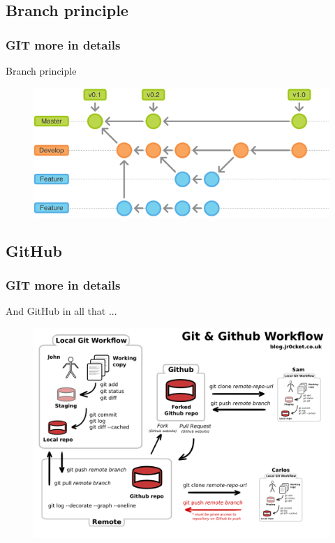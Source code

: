 \documentclass{beamer}
\begin{document}
\subsection{Branch principle}

\begin{frame}
  \frametitle{GIT more in details}
  \begin{block}{Branch principle}
    \begin{figure}
      \centering
      \includegraphics[width=.8\textwidth]{./images/git-branch.png}
    \end{figure}
  \end{block}
\end{frame}

\subsection{GitHub}

\begin{frame}
  \frametitle{GIT more in details}
  \begin{block}{And GitHub in all that ...}
    \begin{figure}
      \centering
      \includegraphics[width=.8\textwidth]{./images/git-and-github-workflow.png}
    \end{figure}
  \end{block}
\end{frame}
\end{document}

